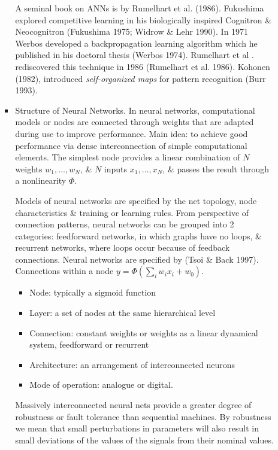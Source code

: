 \documentclass{article}
\begin{document}
\begin{enumerate}
\begin{itemize}
\begin{itemize}
			A seminal book on ANNs is by Rumelhart et al. (1986). Fukushima explored competitive learning in his biologically inspired Cognitron \& Neocognitron (Fukushima 1975; Widrow \& Lehr 1990). In 1971 Werbos developed a backpropagation learning algorithm which he published in his doctoral thesis (Werbos 1974). Rumelhart
			et al . rediscovered this technique in 1986 (Rumelhart et al. 1986). Kohonen (1982), introduced {\it self-organized maps} for pattern recognition (Burr 1993).
			\item {\sf Structure of Neural Networks.} In neural networks, computational models or nodes are connected through weights that are adapted during use to improve performance. Main idea: to achieve good performance via dense interconnection of simple computational elements. The simplest node provides a linear combination of $N$ weights $w_1,\ldots,w_N$, \& $N$ inputs $x_1,\ldots,x_N$, \& passes the result through a nonlinearity $\Phi$.
			
			Models of neural networks are specified by the net topology, node characteristics \& training or learning rules. From perspective of connection patterns, neural networks can be grouped into 2 categories: feedforward networks, in which graphs have no loops, \& recurrent networks, where loops occur because of feedback connections. Neural networks are specified by (Tsoi \& Back 1997). {\sf Connections within a node $y = \Phi\left(\sum_i w_ix_i + w_0\right)$.}
			\begin{itemize}
				\item Node: typically a sigmoid function
				\item Layer: a set of nodes at the same hierarchical level
				\item Connection: constant weights or weights as a linear dynamical system, feedforward or recurrent
				\item Architecture: an arrangement of interconnected neurons
				\item Mode of operation: analogue or digital.
			\end{itemize}
			Massively interconnected neural nets provide a greater degree of robustness or fault tolerance than sequential machines. By robustness we mean that small perturbations in parameters will also result in small deviations of the values of the signals from their nominal values.
			

\end{itemize}
\end{itemize}
\end{enumerate}
\end{document}

